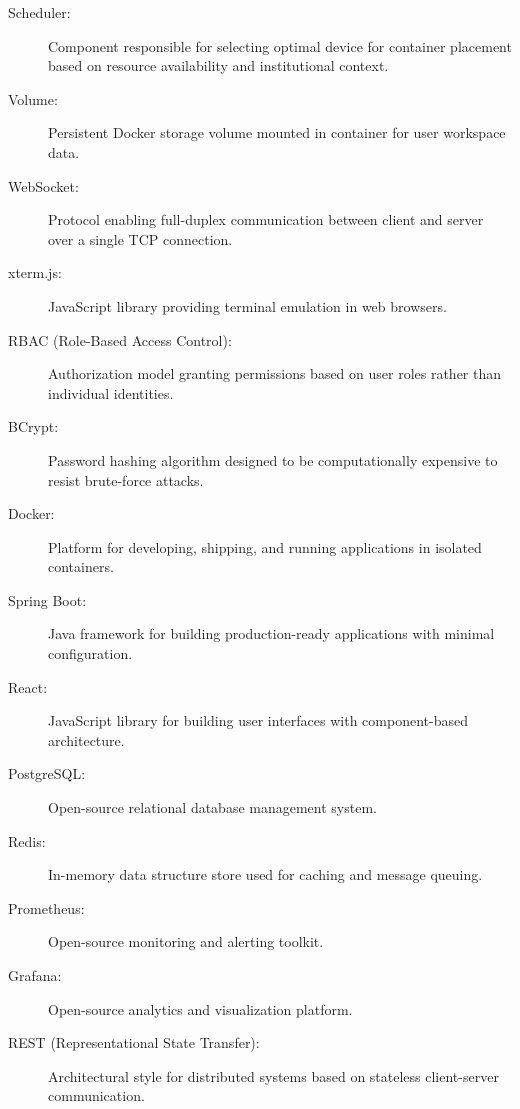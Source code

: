 \documentclass[12pt,a4paper]{article}
\begin{document}
\begin{description}
    \item[Scheduler:] Component responsible for selecting optimal device for container placement based on resource availability and institutional context.
    
    \item[Volume:] Persistent Docker storage volume mounted in container for user workspace data.
    
    \item[WebSocket:] Protocol enabling full-duplex communication between client and server over a single TCP connection.
    
    \item[xterm.js:] JavaScript library providing terminal emulation in web browsers.
    \item[RBAC (Role-Based Access Control):] Authorization model granting permissions based on user roles rather than individual identities.
    
    \item[BCrypt:] Password hashing algorithm designed to be computationally expensive to resist brute-force attacks.
    
    \item[Docker:] Platform for developing, shipping, and running applications in isolated containers.
    
    \item[Spring Boot:] Java framework for building production-ready applications with minimal configuration.
    
    \item[React:] JavaScript library for building user interfaces with component-based architecture.
    
    \item[PostgreSQL:] Open-source relational database management system.
    
    \item[Redis:] In-memory data structure store used for caching and message queuing.
    
    \item[Prometheus:] Open-source monitoring and alerting toolkit.
    
    \item[Grafana:] Open-source analytics and visualization platform.
    
    \item[REST (Representational State Transfer):] Architectural style for distributed systems based on stateless client-server communication.
    

\end{description}
\end{document}
